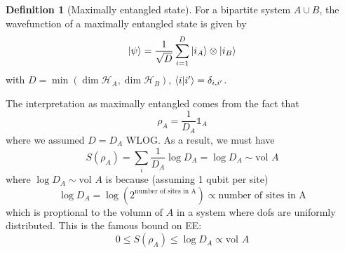 \documentclass[11pt]{article}
\theoremstyle{remark}
\theoremstyle{definition}
\newtheorem{definition}{Definition}[section]
\begin{document}
\begin{definition}[Maximally entangled state]
	For a bipartite system $A \cup B$, the wavefunction of a maximally entangled state is given by
	 \begin{equation}
		 \ket{\psi} =  \frac{1}{\sqrt{D}} \sum_{i=1}^{D} \ket{i_A} \otimes \ket{i_B}
	\end{equation}
	with $D = \min(\dim\mathcal{H}_A, \dim \mathcal{H}_B)$,  $\braket{i}{i'} = \delta_{i,i'}$. 
\end{definition}
The interpretation as maximally entangled comes from the fact that
\[
	\rho_A = \frac{1}{D_A} \mathbb{1}_A
\] 
where we assumed $D = D_A$ WLOG. As a result, we must have
\[
	S(\rho_A) = \sum_{i} \frac{1}{D_A}\log D_A  = \log D_A \sim \text{vol }A
\] 
where $\log D_A \sim \text{vol }A$ is because (assuming 1 qubit per site)
 \[
	 \log D_A = \log(2^{\text{number of sites in A}}) \propto \text{number of sites in A}
\] 
which is proptional to the volumn of $A$ in a system where dofs are uniformly distributed.  
This is the famous bound on EE:
\begin{equation}
	0 \le S(\rho_A) \le \log D_A \propto \text{vol } A
\end{equation}



%
\end{document}
